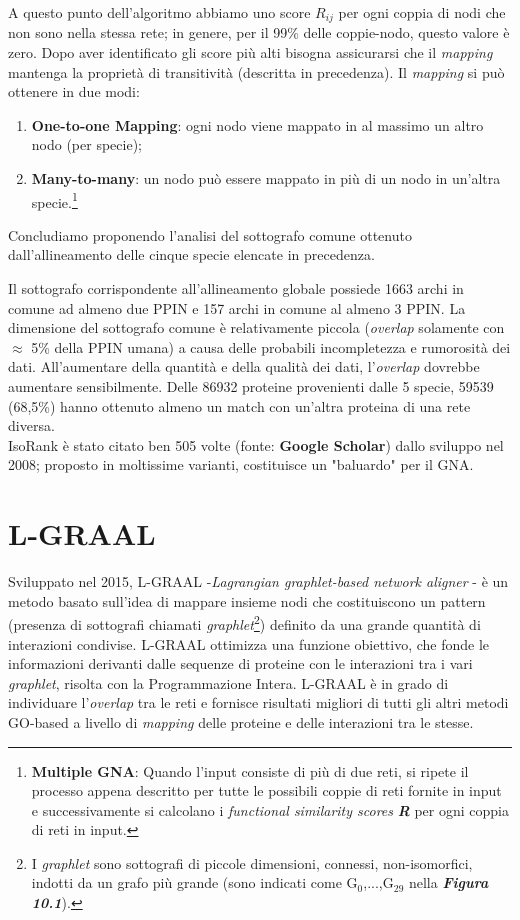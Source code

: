 \documentclass[11pt]{article}
\begin{document}
A questo punto dell'algoritmo abbiamo uno score $R_{ij}$ per ogni coppia di nodi che non sono nella stessa rete; in genere, per il 99\% delle coppie-nodo, questo valore è zero. Dopo aver identificato gli score più alti bisogna assicurarsi che il \textit{mapping} mantenga la proprietà di transitività (descritta in precedenza). Il \textit{mapping} si può ottenere in due modi: 
\begin{enumerate}
\setlength{\itemsep}{1pt}
  \setlength{\parskip}{0pt}
  \setlength{\parsep}{0pt}
\item \textbf{One-to-one Mapping}: ogni nodo viene mappato in al massimo un altro nodo (per specie);
\item \textbf{Many-to-many}: un nodo può essere mappato in più di un nodo in un'altra specie.\footnote{\textbf{Multiple GNA}: Quando l'input consiste di più di due reti, si ripete il processo appena descritto per tutte le possibili coppie di reti fornite in input e successivamente si calcolano i \textit{functional similarity scores} \textit{\textbf{R}} per ogni coppia di reti in input.}
\end{enumerate}

Concludiamo proponendo l'analisi del sottografo comune ottenuto dall'allineamento delle cinque specie elencate in precedenza.

Il sottografo corrispondente all'allineamento globale possiede 1663 archi in comune ad almeno due PPIN e 157 archi in comune al almeno 3 PPIN. La dimensione del sottografo comune è relativamente piccola (\textit{overlap} solamente con $\approx$ 5\% della PPIN umana) a causa delle probabili incompletezza e rumorosità dei dati. All'aumentare della quantità e della qualità dei dati, l'\textit{overlap} dovrebbe aumentare sensibilmente. Delle 86932 proteine provenienti dalle 5 specie, 59539 (68,5\%) hanno ottenuto almeno un match con un'altra proteina di una rete diversa.\\

IsoRank è stato citato ben 505 volte (fonte: \textbf{Google Scholar}) dallo sviluppo nel 2008; proposto in moltissime varianti, costituisce un "baluardo" per il GNA.

\pagebreak
\section{L-GRAAL}
Sviluppato nel 2015, L-GRAAL -\textit{Lagrangian graphlet-based network aligner} - è un metodo basato sull'idea di mappare insieme nodi che costituiscono un pattern (presenza di sottografi chiamati \textit{graphlet}\footnote{I \textit{graphlet} sono sottografi di piccole dimensioni, connessi, non-isomorfici, indotti da un grafo più grande (sono indicati come G$_0$,...,G$_{29}$ nella \textit{\textbf{Figura 10.1}}).}) definito da una grande quantità di interazioni condivise. L-GRAAL ottimizza una funzione obiettivo, che fonde le informazioni derivanti dalle sequenze di proteine con le interazioni tra i vari \textit{graphlet}, risolta con la Programmazione Intera. L-GRAAL è in grado di individuare l'\textit{overlap} tra le reti e fornisce risultati migliori di tutti gli altri metodi GO-based a livello di \textit{mapping} delle proteine e delle interazioni tra le stesse.\\
\end{document}
